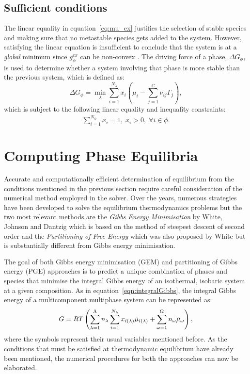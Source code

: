 \subsection{Sufficient conditions}
	The linear equality in equation~\eqref{eq:mu_ex} justifies the selection of stable species and making sure that no metastable species gets added to the system. However, satisfying the linear equation is insufficient to conclude that the system is at a \emph{global} minimum since $g_{\phi}^{ex}$ can be non-convex \cite{Piro16}. The driving force of a phase, $\Delta G_{\phi} $, is used to determine whether a system involving that phase is more stable than the previous system, which is defined as:
	\begin{equation}
        		\Delta G_{\phi}= \min_{\lambda} \sum_{i=1}^{N_{\lambda}}x_{i} \left (\mu_{i} - \sum_{j=1}^C \nu_{ij}\Gamma_j \right ),
    	\end{equation}
	which is subject to the following linear equality and inequality constraints:
	\begin{align}
		\sum_{i=1}^{N_\phi} x_i = 1, \; x_i > 0, \; \forall i \in \phi.
	\end{align}
	

\section{Computing Phase Equilibria}
Accurate and computationally efficient determination of equilibrium from the conditions mentioned in the previous section require careful consideration of the numerical method employed in the solver. Over the years, numerous strategies have been developed to solve the equilibrium thermodynamics problems but the two most relevant methods are the \emph{Gibbs Energy Minimisation} by White, Johnson and Dantzig \cite{White:58} which is based on the method of steepest descent of second order and the \emph{Partitioning of Free Energy}  which was also proposed by White \cite{White67} but is substantially different from Gibbs energy minimisation.

The goal of both Gibbs energy minimisation (GEM) and partitioning of Gibbs energy (PGE) approaches is to predict a unique combination of phases and species that minimise the integral Gibbs energy of an isothermal, isobaric system at a given composition. As in equation~\eqref{eqn:integralGibbs}, the integral Gibbs energy of a multicomponent multiphase system can be represented as:
\begin{equation}\label{eq:int_gibbs}
    G = RT \left(\sum_{\lambda=1}^{\Lambda} n_\lambda \sum_{i = 1}^{N_{\lambda}} x_{i(\lambda)} \tilde{\mu}_{i(\lambda)} + \sum_{\omega=1}^{\Omega} n_\omega \tilde{\mu}_{\omega}\right),
\end{equation}
where the symbols represent their usual variables mentioned before. 
As the conditions that must be satisfied at thermodynamic equilibrium have already been mentioned, the numerical procedures for  both the approaches can now be elaborated.

